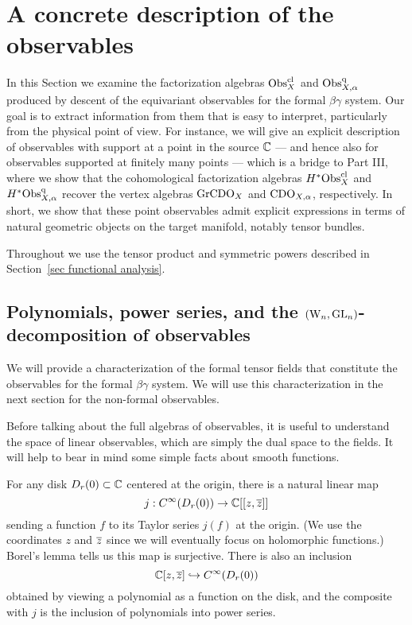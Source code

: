 \section{A concrete description of the observables}
\label{sec concrete}

In this Section we examine the factorization algebras ${\rm Obs}^{\rm cl}_X$ and ${\rm Obs}^{\rm q}_{X,\alpha}$ 
produced by descent of the equivariant observables for the formal $\beta\gamma$ system.
Our goal is to extract information from them that is easy to interpret,
particularly from the physical point of view.
For instance, we will give an explicit description of observables with support at a point in the source $\mathbb C$ --- and hence also for observables supported at finitely many points --- which is a bridge to Part III, where we show that the cohomological factorization algebras
$H^*{\rm Obs}^{\rm cl}_X$ and $H^*{\rm Obs}^{\rm q}_{X,\alpha}$ recover the vertex algebras ${\rm Gr}{\rm CDO}_X$ and ${\rm CDO}_{X,\alpha}$, respectively.
In short, we show that these point observables admit explicit expressions in terms of natural geometric objects on the target manifold, 
notably tensor bundles.

Throughout we use the tensor product and symmetric powers described in
Section~\ref{sec functional analysis}.


\subsection{Polynomials, power series, and the $({{\rm W}_n},{\rm GL}_n)$-decomposition of observables}

We will provide a characterization of the formal tensor fields 
that constitute the observables for the formal $\beta\gamma$ system.
We will use this characterization in the next section
for the non-formal observables.

Before talking about the full algebras of observables, 
it is useful to understand the space of linear observables,
which are simply the dual space to the fields.
It will help to bear in mind some simple facts about smooth functions.

For any disk $D_r(0) \subset \mathbb C$ centered at the origin, 
there is a natural linear map
\[
j: C^\infty(D_r(0)) \to \mathbb C[[z,\overline{z}]]
\]
sending a function $f$ to its Taylor series $j(f)$ at the origin.
(We use the coordinates $z$ and $\overline{z}$ since we will eventually focus on holomorphic functions.)
Borel's lemma tells us this map is surjective.
There is also an inclusion
\[
\mathbb C[z,\overline{z}] \hookrightarrow C^\infty(D_r(0))
\]
obtained by viewing a polynomial as a function on the disk,
and the composite with $j$ is the inclusion of polynomials into power series.

